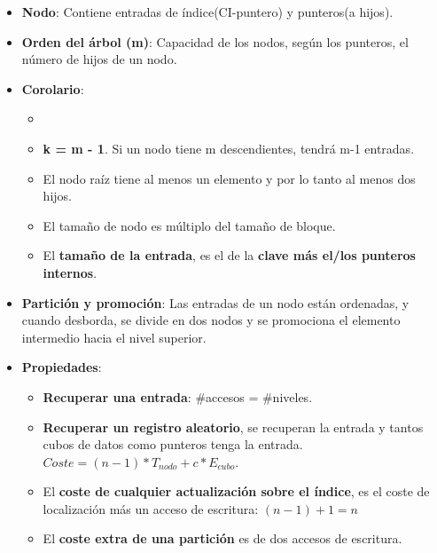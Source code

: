 \documentclass[12pt, twoside, openright]{report} %
\begin{document}
  \begin{itemize}
  \item \textbf{Nodo}: Contiene entradas de índice(CI-puntero) y punteros(a
    hijos).
    
  \item \textbf{Orden del árbol (m)}: Capacidad de los nodos, según los
    punteros, el número de hijos de un nodo.
    
  \item \textbf{Corolario}:
    

    \begin{itemize}
    \item \item \textbf{k = m - 1}. Si un nodo tiene m descendientes, tendrá m-1
      entradas.
      
    \item El nodo raíz tiene al menos un elemento y por lo tanto al menos
      dos hijos.
      
    \item El tamaño de nodo es múltiplo del tamaño de bloque.
      
    \item El \textbf{tamaño de la entrada}, es el de la \textbf{clave más
      el/los punteros internos}.
      
    \end{itemize}
  \item \textbf{Partición y promoción}: Las entradas de un nodo están
    ordenadas, y cuando desborda, se divide en dos nodos y se promociona
    el elemento intermedio hacia el nivel superior.
    \pagebreak
  \item \textbf{Propiedades}:
    

    \begin{itemize}
    \item \textbf{Recuperar una entrada}: \#accesos = \#niveles.
      
    \item \textbf{Recuperar un registro aleatorio}, se recuperan la entrada
      y tantos cubos de datos como punteros tenga la entrada. $Coste= (n-1)*T_{nodo} + c*E_{cubo}$.
      
    \item El \textbf{coste de cualquier actualización sobre el índice}, es
      el coste de localización más un acceso de escritura: $(n-1) +1 = n$
      
    \item El \textbf{coste extra de una partición} es de dos accesos de
      escritura.
      

\end{itemize}
\end{itemize}
\end{document}
